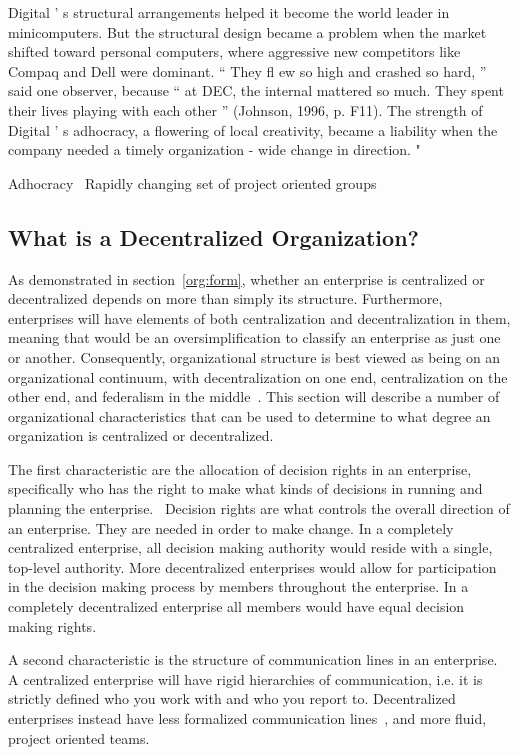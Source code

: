 Digital ’ s structural arrangements helped it become the world leader in minicomputers. But the structural design became a problem when the market shifted toward personal computers, where aggressive new competitors like Compaq and Dell were dominant. “ They fl ew so high and crashed so hard, ” said one observer, because “ at DEC, the internal mattered so much. They spent their lives playing with each other ” (Johnson, 1996, p. F11). The strength of Digital ’ s adhocracy, a flowering of local creativity, became a liability when the company needed a timely organization - wide change in direction.
"

Adhocracy~\cite{Applegate1988a}
Rapidly changing set of project oriented groups

\subsection{What is a Decentralized Organization?}

As demonstrated in section~\ref{org:form}, whether an enterprise is centralized or decentralized depends on more than simply its structure. Furthermore, enterprises will have elements of both centralization and decentralization in them, meaning that would be an oversimplification to classify an enterprise as just one or another. Consequently, organizational structure is best viewed as being on an organizational continuum, with decentralization on one end, centralization on the other end, and federalism in the middle~\cite{pearlson2009}. This section will describe a number of organizational characteristics that can be used to determine to what degree an organization is centralized or decentralized. 

The first characteristic are the allocation of decision rights in an enterprise, specifically who has the right to make what kinds of decisions in running and planning the enterprise.~\cite{pearlson2009} Decision rights are what controls the overall direction of an enterprise. They are needed in order to make change. In a completely centralized enterprise, all decision making authority would reside with a single, top-level authority. More decentralized enterprises would allow for participation in the decision making process by members throughout the enterprise. In a completely decentralized enterprise all members would have equal decision making rights. 

A second characteristic is the structure of communication lines in an enterprise. A centralized enterprise will have rigid hierarchies of communication, i.e. it is strictly defined who you work with and who you report to. Decentralized enterprises instead have less formalized communication lines~\cite{pearlson2009}, and more fluid, project oriented teams.~\cite{Applegate1988a}

